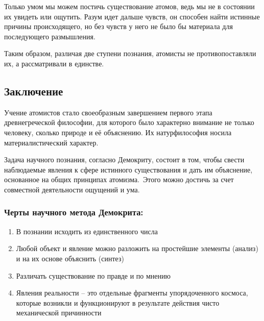 \documentclass[
]{article}
\providecommand{\tightlist}{%
  \setlength{\itemsep}{0pt}\setlength{\parskip}{0pt}}
\begin{document}
Только умом мы можем постичь существование атомов, ведь мы не в
состоянии их увидеть или ощутить. Разум идет дальше чувств, он способен
найти истинные причины происходящего, но без чувств у него не было бы
материала для последующего размышления.

Таким образом, различая две ступени познания, атомисты не
противопоставляли их, а рассматривали в единстве.

\hypertarget{ux437ux430ux43aux43bux44eux447ux435ux43dux438ux435-1}{%
\subsection{Заключение}\label{ux437ux430ux43aux43bux44eux447ux435ux43dux438ux435-1}}

Учение атомистов стало своеобразным завершением первого этапа
древнегреческой философии, для которого было характерно внимание не
только человеку, сколько природе и её объяснению. Их натурфилософия
носила материалистический характер.

Задача научного познания, согласно Демокриту, состоит в том, чтобы
свести наблюдаемые явления к сфере истинного существования и дать им
объяснение, основанное на общих принципах атомизма.~Этого можно достичь
за счет совместной деятельности ощущений и ума.~

\hypertarget{ux447ux435ux440ux442ux44b-ux43dux430ux443ux447ux43dux43eux433ux43e-ux43cux435ux442ux43eux434ux430-ux434ux435ux43cux43eux43aux440ux438ux442ux430}{%
\subsubsection{Черты научного метода
Демокрита:}\label{ux447ux435ux440ux442ux44b-ux43dux430ux443ux447ux43dux43eux433ux43e-ux43cux435ux442ux43eux434ux430-ux434ux435ux43cux43eux43aux440ux438ux442ux430}}

\begin{enumerate}
\def\labelenumi{\arabic{enumi}.}
\tightlist
\item
  В познании исходить из единственного числа
\item
  Любой объект и явление можно разложить на простейшие элементы (анализ)
  и на их основе объяснить (синтез)
\item
  Различать существование по правде и по мнению
\item
  Явления реальности -- это отдельные фрагменты упорядоченного космоса,
  которые возникли и функционируют в результате действия чисто
  механической причинности
\end{enumerate}
\end{document}
